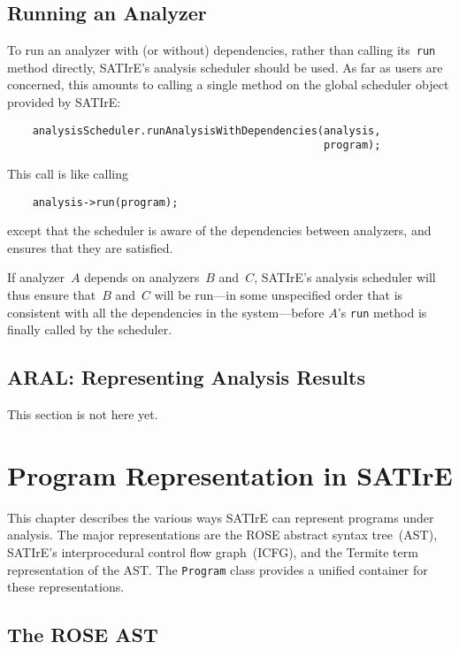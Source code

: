 \documentclass[a4paper,12pt]{report}
\begin{document}
\section{Running an Analyzer}
\label{sec:run_analyzer}

To run an analyzer with (or without) dependencies, rather than calling
its~\texttt{run} method directly, SATIrE's analysis scheduler should be
used. As far as users are concerned, this amounts to calling a single method
on the global scheduler object provided by SATIrE:
\begin{verbatim}
    analysisScheduler.runAnalysisWithDependencies(analysis,
                                                  program);
\end{verbatim}
This call is like calling
\begin{verbatim}
    analysis->run(program);
\end{verbatim}
except that the scheduler is aware of the dependencies between analyzers,
and ensures that they are satisfied.

If analyzer~\(A\) depends on analyzers~\(B\) and~\(C\), SATIrE's analysis
scheduler will thus ensure that~\(B\) and~\(C\) will be run---in some
unspecified order that is consistent with all the dependencies in the
system---before \(A\)'s \texttt{run} method is finally called by the
scheduler.

\section{ARAL: Representing Analysis Results}
\label{sec:aral}

This section is not here yet.

\chapter{Program Representation in SATIrE}
\label{chap:program_representation}

This chapter describes the various ways SATIrE can represent programs under
analysis. The major representations are the ROSE abstract syntax tree~(AST),
SATIrE's interprocedural control flow graph~(ICFG), and the Termite term
representation of the AST. The \texttt{Program} class provides a unified
container for these representations.

\section{The ROSE AST}
\label{sec:rose_ast}
\end{document}
